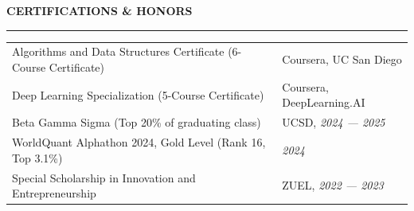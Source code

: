 \documentclass{../original_CV/resume}
\renewcommand{\sectionskip}{\vspace{0.10cm}}
\renewcommand{\sectionlineskip}{\vspace{0.10cm}}
\renewenvironment{rSection}[1]{
\sectionskip
\textcolor{UC San Diego Blue}{\textbf{\large\bfseries\MakeUppercase{#1}}}
\sectionlineskip
\hrule
\begin{list}{}{
\setlength{\leftmargin}{0em}
}
\item[]
}{
\end{list}
}
\begin{document}
\begin{rSection}{CERTIFICATIONS \& HONORS}
\begin{tabularx}{\textwidth}{@{} >{\raggedright\arraybackslash}X >{\raggedleft\arraybackslash\hyphenpenalty=10000\exhyphenpenalty=10000}p{4.8cm} @{}}
Algorithms and Data Structures Certificate (6-Course Certificate) & Coursera, UC San Diego \\
Deep Learning Specialization (5-Course Certificate) & Coursera, DeepLearning.AI \\
Beta Gamma Sigma (Top 20\% of graduating class) & UCSD, {\em 2024 --- 2025} \\
WorldQuant Alphathon 2024, Gold Level (Rank 16, Top 3.1\%) & {\em 2024} \\
Special Scholarship in Innovation and Entrepreneurship & ZUEL, {\em 2022 --- 2023}
\end{tabularx}
\end{rSection}
\end{document}
